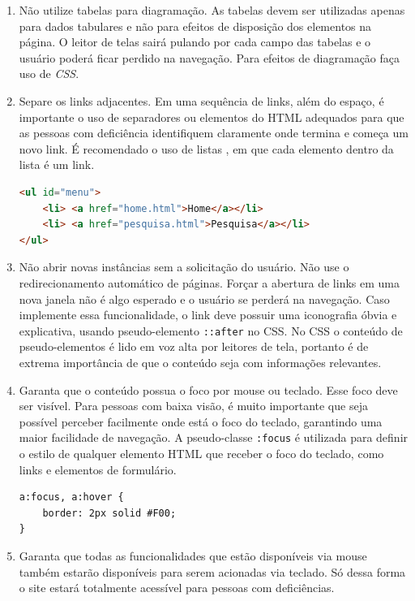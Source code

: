 {{{\begin{enumerate}
{\begin{lstlisting}[language=html,caption=usando landmarks]
<div role="heading" id="cabecalho"> 
  <h1>O Cabeçalho</h1> 
  <a href="#conteudo" accesskey="p">Pular para o conteúdo principals</a> 
</div> 
<div role="navigation" id="navegacao"> conteúdo da navegação </div>
<div role="main" id="conteudo"> conteúdo da main </mdiv>
\end{lstlisting}}
    \item Não utilize tabelas para diagramação. As tabelas devem ser utilizadas apenas para dados tabulares e não para efeitos de disposição dos elementos na página. O leitor de telas sairá pulando por cada campo das tabelas e o usuário poderá ficar perdido na navegação. Para efeitos de diagramação faça uso de \textit{CSS}.
    \item Separe os links adjacentes. Em uma sequência de links, além do espaço, é importante o uso de separadores ou elementos do HTML adequados para que as pessoas com deficiência identifiquem claramente onde termina e começa um novo link. É recomendado o uso de listas , em que cada elemento dentro da lista é um link.
{\begin{lstlisting}[language=html,caption=separando links adjacentes]
<ul id="menu">
    <li> <a href="home.html">Home</a></li>
    <li> <a href="pesquisa.html">Pesquisa</a></li>
</ul>
\end{lstlisting}}
    \item Não abrir novas instâncias sem a solicitação do usuário. Não use o redirecionamento automático de páginas. Forçar a abertura de links em uma nova janela não é algo esperado e o usuário se perderá na navegação. Caso implemente essa funcionalidade, o link deve possuir uma iconografia óbvia e explicativa, usando pseudo-elemento \lstinline{::after} no CSS. No CSS o conteúdo de pseudo-elementos é lido em voz alta por leitores de tela, portanto é de extrema importância de que o conteúdo seja com informações relevantes.
    \item Garanta que o conteúdo possua o foco por mouse ou teclado. Esse foco deve ser visível. Para pessoas com baixa visão, é muito importante que seja possível perceber facilmente onde está o foco do teclado, garantindo uma maior facilidade de navegação. A pseudo-classe \lstinline{:focus} é utilizada para definir o estilo de qualquer elemento HTML que receber o foco do teclado, como links e elementos de formulário.
{\begin{lstlisting}[language=html,caption=usando o foco visível]
a:focus, a:hover {
    border: 2px solid #F00;
}
\end{lstlisting}}
    \item Garanta que todas as funcionalidades que estão disponíveis via mouse também estarão disponíveis para serem acionadas via teclado. Só dessa forma o site estará totalmente acessível para pessoas com deficiências. 
\end{enumerate}
}
}
}

